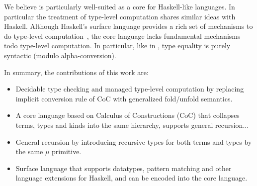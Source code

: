 We believe \name is particularly well-suited as a core for
Haskell-like languages. In particular the treatment of type-level computation
shares similar ideas with Haskell. Although Haskell's surface language
provides a rich set of mechanisms to do type-level
computation~\cite{}, the core language lacks fundamental mechanisms
todo type-level computation. In particular, like in \name, type equality is purely
syntactic (modulo alpha-conversion). 

\begin{comment}
 and there is no type-level
abstraction. In other words in Haskell, mechanisms such as type
classes and type families

Although it may seem that forcing each step of computation 
at the type-level to be explicit will prevent convinient use of 
type-level computation.

Point about the treatment of type-level computation in Haskell. Haskell's
core language has type applications, but no type-level lambda. Equality 
is syntactic modulo alpha-conversion. This design choice was rooted in the 
desire to support Hindley-Milner type-inference... 
\end{comment}

In summary, the contributions of this work are:

\begin{itemize}

\item Decidable type checking and managed type-level computation by
  replacing implicit conversion rule of CoC with generalized
  \textsf{fold}/\textsf{unfold} semantics.

\item A core language based on Calculus of Constructions (CoC) that
  collapses terms, types and kinds into the same hierarchy, supports
  general recursion...

\item General recursion by introducing recursive types for both terms
  and types by the same $\mu$ primitive.

\item Surface language that supports datatypes, pattern matching and
  other language extensions for Haskell, and can be encoded into the
  core language.

\end{itemize}



